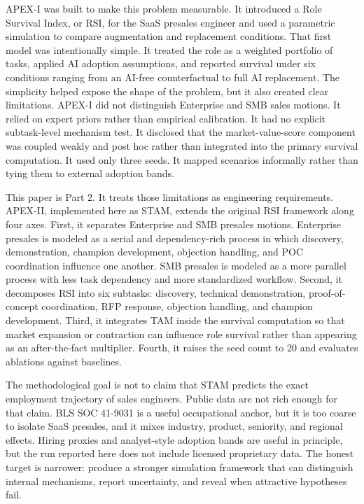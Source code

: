\documentclass[10pt,conference]{IEEEtran}
\begin{document}
APEX-I was built to make this problem measurable. It introduced a Role Survival Index, or RSI, for the SaaS presales engineer and used a parametric simulation to compare augmentation and replacement conditions. That first model was intentionally simple. It treated the role as a weighted portfolio of tasks, applied AI adoption assumptions, and reported survival under six conditions ranging from an AI-free counterfactual to full AI replacement. The simplicity helped expose the shape of the problem, but it also created clear limitations. APEX-I did not distinguish Enterprise and SMB sales motions. It relied on expert priors rather than empirical calibration. It had no explicit subtask-level mechanism test. It disclosed that the market-value-score component was coupled weakly and post hoc rather than integrated into the primary survival computation. It used only three seeds. It mapped scenarios informally rather than tying them to external adoption bands.

This paper is Part 2. It treats those limitations as engineering requirements. APEX-II, implemented here as STAM, extends the original RSI framework along four axes. First, it separates Enterprise and SMB presales motions. Enterprise presales is modeled as a serial and dependency-rich process in which discovery, demonstration, champion development, objection handling, and POC coordination influence one another. SMB presales is modeled as a more parallel process with less task dependency and more standardized workflow. Second, it decomposes RSI into six subtasks: discovery, technical demonstration, proof-of-concept coordination, RFP response, objection handling, and champion development. Third, it integrates TAM inside the survival computation so that market expansion or contraction can influence role survival rather than appearing as an after-the-fact multiplier. Fourth, it raises the seed count to 20 and evaluates ablations against baselines.

The methodological goal is not to claim that STAM predicts the exact employment trajectory of sales engineers. Public data are not rich enough for that claim. BLS SOC 41-9031 is a useful occupational anchor, but it is too coarse to isolate SaaS presales, and it mixes industry, product, seniority, and regional effects. Hiring proxies and analyst-style adoption bands are useful in principle, but the run reported here does not include licensed proprietary data. The honest target is narrower: produce a stronger simulation framework that can distinguish internal mechanisms, report uncertainty, and reveal when attractive hypotheses fail.
\end{document}
